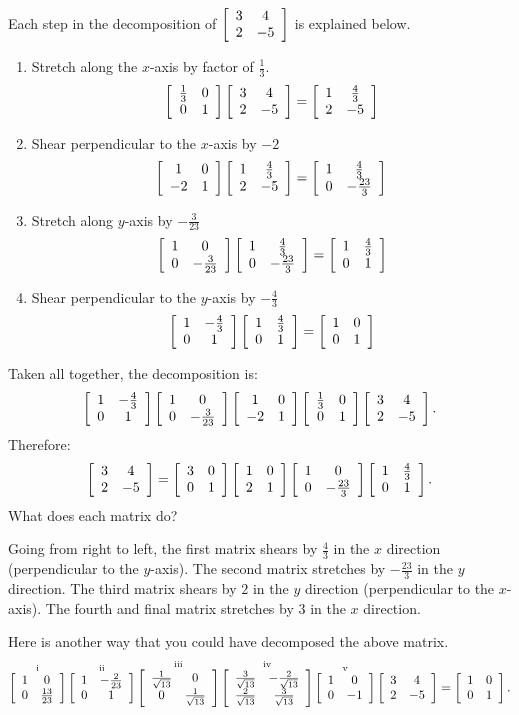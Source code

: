 \documentclass[../key.tex]{subfiles}
\begin{document}
\begin{outer_problem}
\item \label{prob:needed_for_matrix_undo1}Each step in the decomposition of $\twomat{3}{4}{2}{-5}$ is explained below.
\begin{multicols}{2}
\begin{enumerate}[label=(\roman*)]
\item Stretch along the $x$-axis by factor of $\frac{1}{3}$.
$$\twomat{\frac{1}{3}}{0}{0}{1}\twomat{3}{4}{2}{-5}=\twomat{1}{\frac{4}{3}}{2}{-5}$$
\item Shear perpendicular to the $x$-axis by $-2$
$$\twomat{1}{0}{-2}{1}\twomat{1}{\frac{4}{3}}{2}{-5}=\twomat{1}{\frac{4}{3}}{0}{-\frac{23}{3}}$$
\item Stretch along $y$-axis by $-\frac{3}{23}$
$$\twomat{1}{0}{0}{-\frac{3}{23}}\twomat{1}{\frac{4}{3}}{0}{-\frac{23}{3}}=\twomat{1}{\frac{4}{3}}{0}{1}$$
\item Shear perpendicular to the $y$-axis by $-\frac{4}{3}$
$$\twomat{1}{-\frac{4}{3}}{0}{1}\twomat{1}{\frac{4}{3}}{0}{1}=\twomat{1}{0}{0}{1}$$
\end{enumerate}
\end{multicols}
Taken all together, the decomposition is:
$$\twomat{1}{-\frac{4}{3}}{0}{1}\twomat{1}{0}{0}{-\frac{3}{23}}\twomat{1}{0}{-2}{1}\twomat{\frac{1}{3}}{0}{0}{1}\twomat{3}{4}{2}{-5}.$$
Therefore: $$\twomat{3}{4}{2}{-5}=\twomat{3}{0}{0}{1}\twomat{1}{0}{2}{1}\twomat{1}{0}{0}{-\frac{23}{3}}\twomat{1}{\frac{4}{3}}{0}{1}.$$ What does each matrix do?
\end{outer_problem}

Going from right to left, the first matrix shears by $\frac{4}{3}$ in the $x$ direction (perpendicular to the $y$-axis). The second matrix stretches by $-\frac{23}{3}$ in the $y$ direction. The third matrix shears by $2$ in the $y$ direction (perpendicular to the $x$-axis). The fourth and final matrix stretches by $3$ in the $x$ direction.

\begin{outer_problem}
\setcounter{problem_i}{\value{outer_problemi}}
\item\label{prob:needed_for_matrix_undo2}Here is another way that you could have decomposed the above matrix.
\vspace{-2ex}
$$\mathop{\twomat{1}{0}{0}{\frac{13}{23}}}^{\text{i}}
\mathop{\twomat{1}{-\frac{2}{23}}{0}{1}}^{\text{ii}}
\mathop{\twomat{\frac{1}{\sqrt{13}}}{0}{0}{\frac{1}{\sqrt{13}}}}^{\text{iii}}
\mathop{\twomat{\frac{3}{\sqrt{13}}}{-\frac{2}{\sqrt{13}}}{\frac{2}{\sqrt{13}}}{\frac{3}{\sqrt{13}}}}^{\text{iv}}
\mathop{\twomat{1}{0}{0}{-1}}^{\text{v}}
\twomat{3}{4}{2}{-5}=\twomat{1}{0}{0}{1}.$$
\end{outer_problem}
\end{document}
